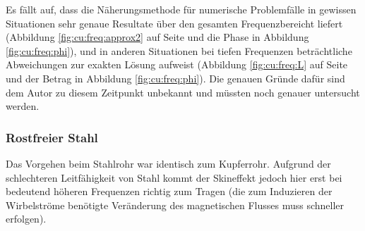 {	\begin{minipage}[t]{0.33\textwidth}
        \vspace{0pt}

        Es  f\"allt   auf,  dass   die  N\"aherungsmethode   f\"ur  numerische
        Problemf\"alle   in  gewissen   Situationen   sehr  genaue   Resultate
        \"uber    den    gesamten    Frequenzbereicht    liefert    (Abbildung
        \ref{fig:cu:freq:approx2} auf  Seite \pageref{fig:cu:freq:approx2} und
        die  Phase   in  Abbildung  \ref{fig:cu:freq:phi}),  und   in  anderen
        Situationen   bei  tiefen   Frequenzen  betr\"achtliche   Abweichungen
        zur   exakten   L\"osung   aufweist   (Abbildung   \ref{fig:cu:freq:L}
        auf  Seite   \pageref{fig:cu:freq:L}  und  der  Betrag   in  Abbildung
        \ref{fig:cu:freq:phi}). Die genauen Gr\"unde daf\"ur sind dem Autor zu
        diesem  Zeitpunkt  unbekannt  und m\"ussten  noch  genauer  untersucht
        werden.

        
	\end{minipage}%
	\begin{minipage}[t]{0.67\textwidth}
        \vspace{0pt}
        \resizebox{.95\textwidth}{!}{}
        \label{fig:cu:freq:phi}
	\end{minipage}


	\begin{minipage}[t]{0.33\textwidth}
        \vspace{0pt}
        \subsubsection{Rostfreier Stahl}
        \label{sec:ausw:subsec:hohlz:subsubsec:steel}

        Das Vorgehen beim Stahlrohr war identisch zum Kupferrohr. Aufgrund der
        schlechteren  Leitf\"ahigkeit von  Stahl kommt  der Skineffekt  jedoch
        hier  erst  bei  bedeutend  h\"oheren Frequenzen  richtig  zum  Tragen
        (die zum  Induzieren der Wirbelstr\"ome ben\"otigte  Ver\"anderung des
        magnetischen Flusses muss schneller erfolgen).


\end{minipage}}
